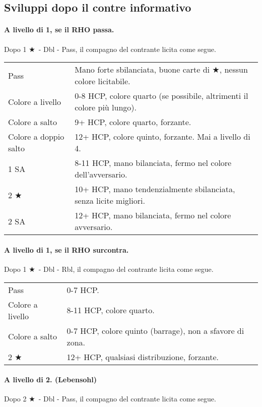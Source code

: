 \documentclass[a4paper,10pt]{article}
\renewcommand{\j}{$\bigstar$\xspace}
\newcommand{\sa}{SA\xspace}
\newcommand{\smallspace}{\vskip0.3cm}
\newenvironment{twocol}
  {\smallspace\noindent\begin{tabular}{l p{0.78\textwidth}}}
  {\end{tabular}\smallspace}
\begin{document}
\subsection{Sviluppi dopo il contre informativo}

\paragraph{A livello di 1, se il RHO passa.} Dopo 1 \j\ - Dbl - Pass, il compagno del contrante licita come segue.

\begin{twocol}
	Pass & Mano forte sbilanciata, buone carte di \j, nessun colore licitabile. \\
	Colore a livello & 0-8 HCP, colore quarto (se possibile, altrimenti il colore più lungo). \\
	Colore a salto & 9+ HCP, colore quarto, forzante. \\
	Colore a doppio salto & 12+ HCP, colore quinto, forzante. Mai a livello di 4. \\
	1 \sa & 8-11 HCP, mano bilanciata, fermo nel colore dell'avversario. \\
	2 \j & 10+ HCP, mano tendenzialmente sbilanciata, senza licite migliori. \\
	2 \sa & 12+ HCP, mano bilanciata, fermo nel colore avversario. \\
\end{twocol}

\paragraph{A livello di 1, se il RHO surcontra.} Dopo 1 \j\ - Dbl - Rbl, il compagno del contrante licita come segue.

\begin{twocol}
	Pass & 0-7 HCP. \\
	Colore a livello & 8-11 HCP, colore quarto. \\
	Colore a salto & 0-7 HCP, colore quinto (barrage), non a sfavore di zona. \\
	2 \j & 12+ HCP, qualsiasi distribuzione, forzante. \\
\end{twocol}

\paragraph{A livello di 2. (Lebensohl)} Dopo 2 \j\ - Dbl - Pass, il compagno del contrante licita come segue.
\end{document}
